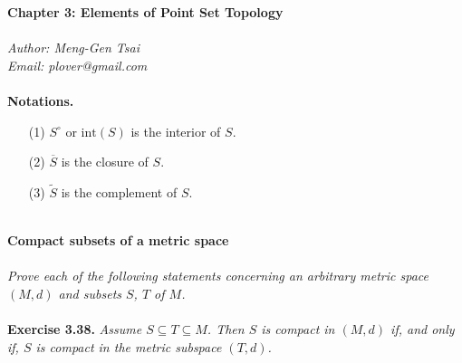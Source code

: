 \documentclass{article}
\begin{document}
\textbf{\Large Chapter 3: Elements of Point Set Topology} \\\\



\emph{Author: Meng-Gen Tsai} \\
\emph{Email: plover@gmail.com} \\\\






\textbf{Notations.}
\begin{enumerate}
\item[(1)]
$S^{\circ}$ or $\text{int}(S)$ is the interior of $S$.
\item[(2)]
$\overline{S}$ is the closure of $S$.
\item[(3)]
$\widetilde{S}$ is the complement of $S$. \\\\
\end{enumerate}






\textbf{\large Compact subsets of a metric space} \\\\

\emph{Prove each of the following statements concerning an arbitrary metric space
$(M,d)$ and subsets $S$, $T$ of $M$.} \\\\



\textbf{Exercise 3.38.}
\emph{Assume $S \subseteq T \subseteq M$.
Then $S$ is compact in $(M,d)$ if, and only if,
$S$ is compact in the metric subspace $(T,d)$. } \\
\end{document}
